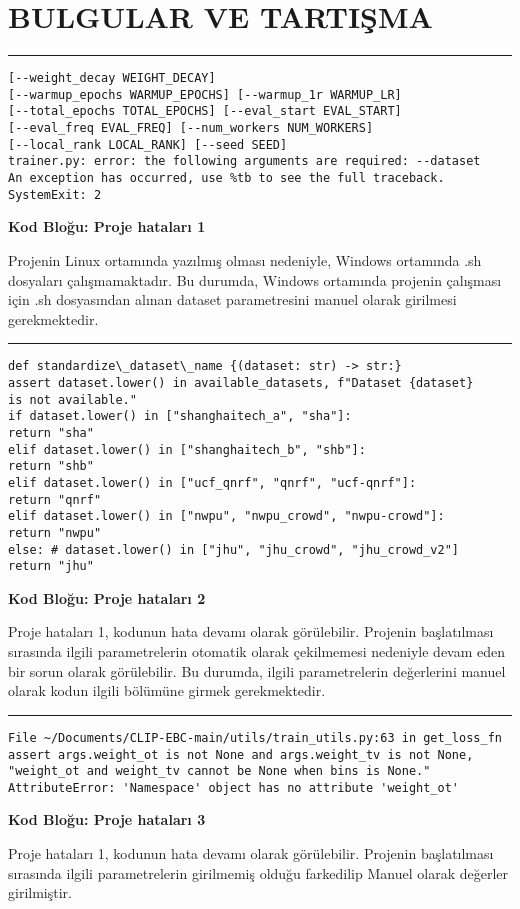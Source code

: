 \documentclass[10pt,a4paper]{report}
\begin{document}
\clearpage


\section{BULGULAR VE TARTIŞMA}
	
\rule{\linewidth}{0.65pt}

\begin{Verbatim}
[--weight_decay WEIGHT_DECAY]
[--warmup_epochs WARMUP_EPOCHS] [--warmup_1r WARMUP_LR]
[--total_epochs TOTAL_EPOCHS] [--eval_start EVAL_START]
[--eval_freq EVAL_FREQ] [--num_workers NUM_WORKERS]
[--local_rank LOCAL_RANK] [--seed SEED]
trainer.py: error: the following arguments are required: --dataset
An exception has occurred, use %tb to see the full traceback.
SystemExit: 2	
\end{Verbatim}
	
\centering \textbf{Kod Bloğu: Proje hataları 1} 

\begin{justify}
Projenin Linux ortamında yazılmış olması nedeniyle, Windows ortamında .sh dosyaları çalışmamaktadır. Bu durumda, Windows ortamında projenin çalışması için .sh dosyasından alınan dataset parametresini manuel olarak girilmesi gerekmektedir.
\end{justify}

\rule{\linewidth}{0.65pt}
\begin{verbatim}
def standardize\_dataset\_name {(dataset: str) -> str:}
assert dataset.lower() in available_datasets, f"Dataset {dataset}
is not available."
if dataset.lower() in ["shanghaitech_a", "sha"]:
return "sha"
elif dataset.lower() in ["shanghaitech_b", "shb"]:
return "shb"
elif dataset.lower() in ["ucf_qnrf", "qnrf", "ucf-qnrf"]:
return "qnrf"
elif dataset.lower() in ["nwpu", "nwpu_crowd", "nwpu-crowd"]:
return "nwpu"
else: # dataset.lower() in ["jhu", "jhu_crowd", "jhu_crowd_v2"]
return "jhu"
\end{verbatim}
\centering \textbf{Kod Bloğu: Proje hataları 2} 
\begin{justify}
	
Proje hataları 1, kodunun hata devamı olarak görülebilir. Projenin başlatılması sırasında ilgili parametrelerin otomatik olarak çekilmemesi nedeniyle devam eden bir sorun olarak görülebilir. Bu durumda, ilgili parametrelerin değerlerini manuel olarak  kodun ilgili bölümüne girmek gerekmektedir.
\end{justify}


\rule{\linewidth}{0.65pt}
\begin{verbatim}
File ~/Documents/CLIP-EBC-main/utils/train_utils.py:63 in get_loss_fn
assert args.weight_ot is not None and args.weight_tv is not None, 
"weight_ot and weight_tv cannot be None when bins is None."	
AttributeError: 'Namespace' object has no attribute 'weight_ot'
\end{verbatim}
\centering \textbf{Kod Bloğu: Proje hataları 3}	
\begin{justify}	
	Proje hataları 1, kodunun hata devamı olarak görülebilir. Projenin başlatılması sırasında ilgili parametrelerin girilmemiş olduğu farkedilip Manuel olarak değerler girilmiştir.
\end{justify}
\end{document}
